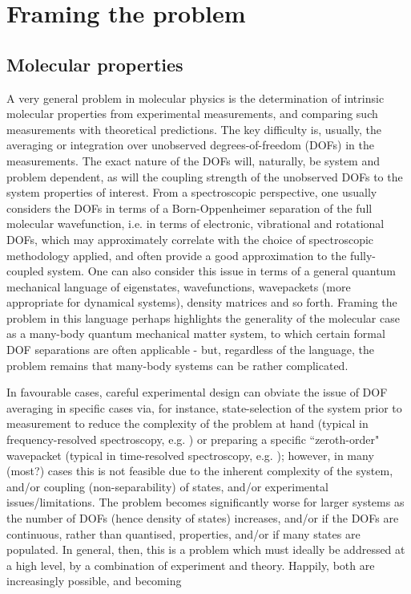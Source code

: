 \section{Framing the problem}

\subsection{Molecular properties}
A very general problem in molecular physics is the determination of intrinsic molecular properties from experimental measurements, and comparing such measurements with theoretical predictions. The key difficulty is, usually, the averaging or integration over unobserved degrees-of-freedom (DOFs) in the measurements. The exact nature of the DOFs will, naturally, be system and problem dependent, as will the coupling strength of the unobserved DOFs to the system properties of interest. From a spectroscopic perspective, one usually considers the DOFs in terms of a Born-Oppenheimer separation of the full molecular wavefunction, i.e. in terms of electronic, vibrational and rotational DOFs, which may approximately correlate with the choice of spectroscopic methodology applied, and often provide a good approximation to the fully-coupled system. One can also consider this issue in terms of a general quantum mechanical language of eigenstates, wavefunctions, wavepackets (more appropriate for dynamical systems), density matrices and so forth. Framing the problem in this language perhaps highlights the generality of the molecular case as a many-body quantum mechanical matter system, to which certain formal DOF separations are often applicable - but, regardless of the language, the problem remains that many-body systems can be rather complicated.

In favourable cases, careful experimental design can obviate the issue of DOF averaging in specific cases via, for instance, state-selection of the system prior to measurement to reduce the complexity of the problem at hand (typical in frequency-resolved spectroscopy, e.g. \cite{bunkerMolSymm, herzberg1945molecular, hollasHighRes}) or preparing a specific ``zeroth-order" wavepacket (typical in time-resolved spectroscopy, e.g. \cite{Tannor2007,Stolow2008,wu2011TimeresolvedPhotoelectronSpectroscopy}); however, in many (most?) cases this is not feasible due to the inherent complexity of the system, and/or coupling (non-separability) of states, and/or experimental issues/limitations. The problem becomes significantly worse for larger systems as the number of DOFs (hence density of states) increases, and/or if the DOFs are continuous, rather than quantised, properties, and/or if many states are populated. In general, then, this is a problem which must ideally be addressed at a high level, by a combination of experiment and theory. Happily, both are increasingly possible, and becoming 